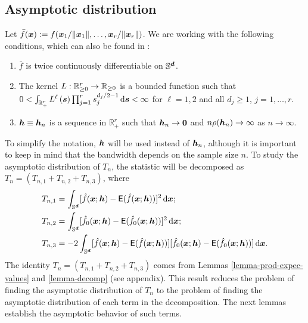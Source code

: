 \documentclass[oneside,11pt]{article}
\begin{document}
\subsection{Asymptotic distribution}

Let $\bar{f}(\boldsymbol{x}):= f(\boldsymbol{x}_1/\|\boldsymbol{x}_1\|,\ldots,\boldsymbol{x}_r/\|\boldsymbol{x}_r\|)$. We are working with the following conditions, which can also be found in \cite{Garcia-Portugues2024}: 
\begin{enumerate}[label=\textbf{A\arabic{*}}., ref=\textbf{A\arabic{*}}]
    \item $\bar{f}$ is twice continuously differentiable on $\mathbb{S}^{\boldsymbol{d}}$. \label{A1}
    \item The kernel $L:\mathbb{R}_{\geq 0}^r\to\mathbb{R}_{\geq 0}$ is a bounded function such that $0<\int_{\mathbb{R}_+^r}L^\ell\left(\boldsymbol{s}\right) \prod_{j=1}^r s_j^{d_j/2-1}\,\mathrm{d} \boldsymbol{s}<\infty$ for $\ell=1,2$ and all $d_j\geq 1$, $j=1,\ldots,r$. \label{A2}
    \item ${\boldsymbol{h}}\equiv{\boldsymbol{h}}_n$ is a sequence in $\mathbb{R}_+^r$ such that ${\boldsymbol{h}}_n\to\mathbf{0}$ and $n\rho({\boldsymbol{h}}_n) \to\infty$ as $n\to\infty$. \label{A3}
\end{enumerate}

To simplify the notation, ${\boldsymbol{h}}$ will be used instead of ${\boldsymbol{h}}_n$, although it is important to keep in mind that the bandwidth depends on the sample size $n$. To study the asymptotic distribution of $T_n$, the statistic will be decomposed as $T_n = (T_{n,1} + T_{n,2} + T_{n,3})$, where
\begin{align*}
    T_{n,1} &= \int_{\mathbb{S}^{\boldsymbol{d}}} [\hat{f}(\boldsymbol{x};{\boldsymbol{h}}) - \mathsf{E} (\hat{f}(\boldsymbol{x};{\boldsymbol{h}}))]^2 \,\mathrm{d} \boldsymbol{x}; \\
    T_{n,2} &= \int_{\mathbb{S}^{\boldsymbol{d}}} [ \hat{f}_{0}(\boldsymbol{x};{\boldsymbol{h}}) - \mathsf{E} (\hat{f}_{0}(\boldsymbol{x};{\boldsymbol{h}})) ]^2 \,\mathrm{d} \boldsymbol{x}; \\
    T_{n,3} &= -2 \int_{\mathbb{S}^{\boldsymbol{d}}} [ \hat{f}(\boldsymbol{x};{\boldsymbol{h}}) - \mathsf{E} (\hat{f}(\boldsymbol{x};{\boldsymbol{h}})) ] [ \hat{f}_{0}(\boldsymbol{x};{\boldsymbol{h}}) - \mathsf{E} (\hat{f}_{0}(\boldsymbol{x};{\boldsymbol{h}})) ] \,\mathrm{d} \boldsymbol{x}.
\end{align*}
The identity $T_n = (T_{n,1} + T_{n,2} + T_{n,3})$ comes from Lemmas \ref{lemma-prod-expec-values} and \ref{lemma-decomp} (see appendix). This result reduces the problem of finding the asymptotic distribution of $T_n$ to the problem of finding the asymptotic distribution of each term in the decomposition. The next lemmas establish the asymptotic behavior of such terms.
\end{document}
